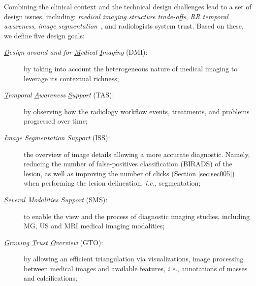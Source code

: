 Combining the clinical context and the technical design challenges lead to a set of design issues, including: \textit{medical imaging structure trade-offs}, \textit{RR temporal awareness}, \textit{image segmentation}~\cite{8736792}, and radiologists system trust.
Based on these, we define five design goals:
\begin{description}
\item[{\it \underline{D}esign around and for \underline{M}edical \underline{I}maging} (DMI):] by taking into account the heterogeneous nature of medical imaging to leverage its contextual richness;
\item[{\it \underline{T}emporal \underline{A}wareness \underline{S}upport} (TAS):] by observing how the radiology workflow events, treatments, and problems progressed over time;
\item[{\it \underline{I}mage \underline{S}egmentation \underline{S}upport} (ISS):] the overview of image details allowing a more accurate diagnostic. Namely, reducing the number of false-positives classification (BIRADS) of the lesion, as well as improving the number of clicks (Section \ref{sec:sec005}) when performing the lesion delineation, {\em i.e.}, segmentation;
\item[{\it\underline{S}everal \underline{M}odalities \underline{S}upport} (SMS):] to enable the view and the process of diagnostic imaging studies, including MG, US and MRI medical imaging modalities;
\item[{\it\underline{G}rowing \underline{T}rust \underline{O}verview} (GTO):] by allowing an efficient triangulation via visualizations, image processing between medical images and available features, {\em i.e.}, annotations of masses and calcifications;
\end{description}

